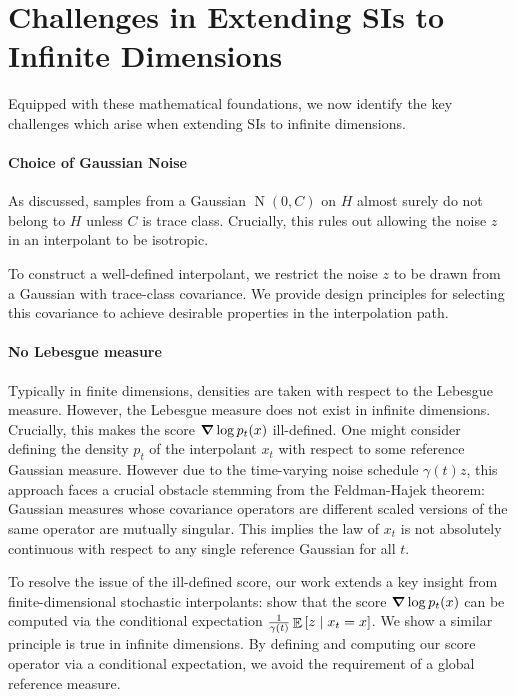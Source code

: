 

\section{Challenges in Extending SIs to Infinite Dimensions}
Equipped with these mathematical foundations, we now identify the key challenges which arise when extending SIs to infinite dimensions.

\paragraph{Choice of Gaussian Noise} As discussed, samples from a Gaussian \(\operatorname{N}(0, C)\) on \(H\) almost surely do not belong to \(H\) unless \(C\) is trace class. Crucially, this rules out allowing the noise \(z\) in an interpolant to be isotropic.

To construct a well-defined interpolant, we restrict the noise \(z\) to be drawn from a Gaussian with trace-class covariance. We provide design principles for selecting this covariance to achieve desirable properties in the interpolation path. %

\paragraph{No Lebesgue measure} Typically in finite dimensions, densities are taken with respect to the Lebesgue measure. However, the Lebesgue measure does not exist in infinite dimensions. Crucially, this makes the score \(\grad \log p_{t}(x)\) ill-defined. One might consider defining the density \(p_{t}\) of the interpolant \(x_{t}\) with respect to some reference Gaussian measure. However due to the time-varying noise schedule \(\gamma(t)z\), this approach faces a crucial obstacle stemming from the Feldman-Hajek theorem: Gaussian measures whose covariance operators are different scaled versions of the same operator are mutually singular. This implies the law of \(x_{t}\) is not absolutely continuous with respect to any single reference Gaussian for all \(t\). %

To resolve the issue of the ill-defined score, our work extends a key insight from finite-dimensional stochastic interpolants: \citet[][Theorem 2.8]{albergo2023stochasticinterpolantsunifyingframework} show that the score \(\grad \log p_{t}(x)\) can be computed via the conditional expectation \(\frac{1}{\gamma(t)} \mathop{\mathbb{E}}\qty[z \mid x_{t} = x]\). We show a similar principle is true in infinite dimensions. By defining and computing our score operator via a conditional expectation, we avoid the requirement of a global reference measure.

